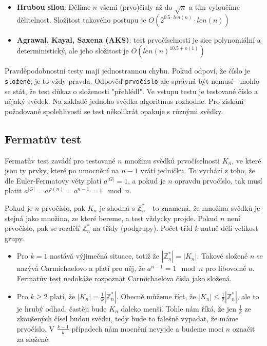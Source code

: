 \begin{itemize}
\item \textbf{Hrubou silou}: Dělíme $n$ všemi (prvo)čísly až do $\sqrt{n}$ a tím
vyloučíme dělitelnost. Složitost takového postupu je $O(2^{0.5\cdot len(n)}\cdot
len(n))$
\item \textbf{Agrawal, Kayal, Saxena (AKS)}:  test prvočíselnosti je sice
polynomiální a deterministický, ale jeho složitost je $O(len(n)^{10.5 + o(1)})$
\end{itemize}

Pravděpodobnostní testy mají jednostrannou chybu. Pokud odpoví, že číslo je
\texttt{složené}, je to vždy pravda. Odpověď \texttt{prvočíslo} ale správná být
nemusí - mohlo se stát, že test důkaz o složenosti "přehlédl". Ve vstupu testu
je testované číslo a nějaký svědek. Na základě jednoho svědka algoritmus
rozhodne. Pro získání požadované spolehlivosti se test několikrát opakuje s
různými svědky.

\subsection{Fermatův test}
Fermatův test zavádí pro testované $n$ množinu svědků prvočíselnosti $K_n$, ve
které jsou ty prvky, které po umocnění na $n-1$ vrátí jedničku. To vychází z toho,
že dle Euler-Fermatovy věty platí $a^{|G|} = 1$, a pokud je $n$ opravdu prvočíslo,
tak musí platit $a^{|G|} = a^{\varphi(n)} = a^{n-1} = 1 \mod n$.

Pokud je $n$ prvočíslo, pak $K_n$ je shodná s $\mathbb{Z}_n^*$ - to znamená, že 
množina svědků je stejná jako množina, ze které bereme, a test vždycky projde.
Pokud $n$ není prvočíslo, pak se rozdělí $\mathbb{Z}_n^*$ na třídy (podgrupy). Počet tříd
$k$ nutně dělí velikost grupy.
\begin{itemize}
\item Pro $k = 1$ nastává výjimečná situace, totiž že $|\mathbb{Z}_n^*| =
|K_n|$. Takové složené $n$ se nazývá Carmichaelovo a platí pro něj, že $a^{n-1}
= 1 \mod n$ pro libovolné $a$. Fermatův test nedokáže rozpoznat Carmichaelova
čísla jako složená.
\item Pro $k \geq 2$ platí, že  $|K_n| = \frac{1}{k}|\mathbb{Z}_n^*|$.  Obecně
můžeme říct, že $|K_n| \leq \frac{1}{2}|\mathbb{Z}_n^*|$, ale to je hrubý odhad,
častěji bude $K_n$ daleko menší. Tohle nám říká, že jen $\frac{1}{k}$ ze zkoušených 
čísel budou svědci, tedy bude to falešně vypadat, že máme prvočíslo. V $\frac{k-1}{k}$
případech nám mocnění nevyjde a budeme moci $n$ označit za složené.
\end{itemize}

